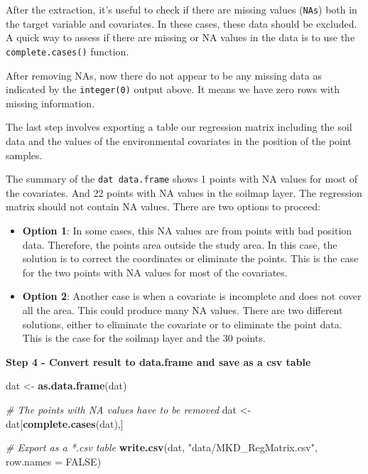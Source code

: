 \documentclass[10pt,b5paper,]{book}
\newenvironment{Shaded}{\begin{snugshade}}{\end{snugshade}}
\newcommand{\CommentTok}[1]{\textcolor[rgb]{0.56,0.35,0.01}{\textit{#1}}}
\newcommand{\DataTypeTok}[1]{\textcolor[rgb]{0.13,0.29,0.53}{#1}}
\newcommand{\KeywordTok}[1]{\textcolor[rgb]{0.13,0.29,0.53}{\textbf{#1}}}
\newcommand{\NormalTok}[1]{#1}
\newcommand{\OtherTok}[1]{\textcolor[rgb]{0.56,0.35,0.01}{#1}}
\newcommand{\StringTok}[1]{\textcolor[rgb]{0.31,0.60,0.02}{#1}}
\theoremstyle{definition}
\theoremstyle{definition}
\theoremstyle{definition}
\theoremstyle{remark}
\begin{document}
After the extraction, it's useful to check if there are missing values
(\texttt{NAs}) both in the target variable and covariates. In these
cases, these data should be excluded. A quick way to assess if there are
missing or NA values in the data is to use the \texttt{complete.cases()}
function.

After removing NAs, now there do not appear to be any missing data as
indicated by the \texttt{integer(0)} output above. It means we have zero
rows with missing information.

The last step involves exporting a table our regression matrix including
the soil data and the values of the environmental covariates in the
position of the point samples.

The summary of the \texttt{dat\ data.frame} shows 1 points with NA
values for most of the covariates. And 22 points with NA values in the
soilmap layer. The regression matrix should not contain NA values. There
are two options to proceed:

\begin{itemize}
\item
  \textbf{Option 1}: In some cases, this NA values are from points with
  bad position data. Therefore, the points area outside the study area.
  In this case, the solution is to correct the coordinates or eliminate
  the points. This is the case for the two points with NA values for
  most of the covariates.
\item
  \textbf{Option 2}: Another case is when a covariate is incomplete and
  does not cover all the area. This could produce many NA values. There
  are two different solutions, either to eliminate the covariate or to
  eliminate the point data. This is the case for the soilmap layer and
  the 30 points.
\end{itemize}

\textbf{Step 4 - Convert result to data.frame and save as a csv table}

\begin{Shaded}
\begin{Highlighting}[]
\NormalTok{dat <-}\StringTok{ }\KeywordTok{as.data.frame}\NormalTok{(dat)}

\CommentTok{# The points with NA values have to be removed }
\NormalTok{dat <-}\StringTok{ }\NormalTok{dat[}\KeywordTok{complete.cases}\NormalTok{(dat),]}

\CommentTok{# Export as a *.csv table}
\KeywordTok{write.csv}\NormalTok{(dat, }\StringTok{"data/MKD_RegMatrix.csv"}\NormalTok{, }\DataTypeTok{row.names =} \OtherTok{FALSE}\NormalTok{)}
\end{Highlighting}
\end{Shaded}
\end{document}
